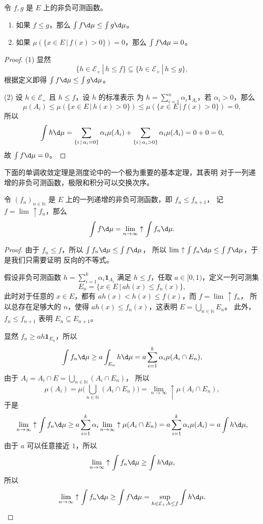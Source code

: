 \documentclass[fontset=none]{Notes}
\newcommand{\ulim}[1][]{\lim_{#1}\mathrel{\uparrow}}
\begin{document}
\begin{proposition}\label{prop:elementary property of positive measurable function}
  令 $f,g$ 是 $E$ 上的非负可测函数。
  \begin{enumerate}
    \item 如果 $f\leq g$，那么 $\int f\d\mu\leq \int g\d\mu$。
    \item 如果 $\mu(\{x\in E\,|\, f(x)> 0\})=0$，那么 $\int f\d\mu=0$。
  \end{enumerate}
\end{proposition}
\begin{proof}
  (1) 显然
  \[
      \bigl\{h\in \mathcal{E}_+\,|\, h\leq f\bigr\}\subseteq 
      \bigl\{h\in \mathcal{E}_+\,|\, h\leq g\bigr\},
  \]
  根据定义即得 $\int f\d\mu\leq \int g\d\mu$。

  (2) 设 $h\in \mathcal{E}_+$ 且 $h\leq f$，设 $h$ 的标准表示
  为 $h=\sum_{i=1}^n \alpha_i\mathbold 1_{A_i}$，若 $\alpha_i> 0$，那么
  \[
    \mu(A_i)\leq   \mu (\{x\in E\,|\, h(x)> 0\})\leq \mu(\{x\in E\,|\, f(x)> 0\})=0,
  \]
  所以
  \[
    \int h\d\mu=\sum_{\{i\,|\,\alpha_i=0\}}\alpha_i\mu(A_i)+
    \sum_{\{i\,|\,\alpha_i>0\}}\alpha_i\mu(A_i)=0+0=0,
  \]
  故 $\int f\d\mu=0$。
\end{proof}

下面的单调收敛定理是测度论中的一个极为重要的基本定理，其表明
对于一列递增的非负可测函数，极限和积分可以交换次序。

\begin{theorem}[单调收敛定理]\label{thm:monotone convergence thm}
  令 $(f_n)_{n\in \mathbb{N}}$ 是 $E$ 上的一列递增的非负可测函数，即 $f_n\leq f_{n+1}$，
  记 $f=\ulim f_n$，那么
  \[
    \int f\d\mu=\ulim[n\to\infty]\int f_n\d\mu.
  \]
\end{theorem}
\begin{proof}
  由于 $f_n\leq f$，所以 $\int f_n\d\mu\leq\int f\d\mu$，
  所以 $\ulim \int f_n\d\mu\leq\int f\d\mu$，于是我们只需要证明
  反向的不等式。

  假设非负可测函数 $h=\sum_{i=1}^k \alpha_i\mathbold 1_{A_i}$
  满足 $h\leq f$，任取 $a\in[0,1)$，定义一列可测集
  \[
    E_n=\{x\in E\,|\, ah(x)\leq f_n(x)\}  ,
  \]
  此时对于任意的 $x\in E$，都有 $ah(x)<h(x)\leq f(x)$，而 $f=\ulim f_n$，
  所以总存在足够大的 $n$，使得 $ah(x)\leq f_n(x)$，这表明 $E=\bigcup_{n\in \mathbb{N}}E_n$。
  此外，$f_n\leq f_{n+1}$ 表明 $E_n\subseteq E_{n+1}$。

  显然 $f_n\geq ah\mathbold 1_{E_n}$，所以
  \[
    \int f_n\d\mu\geq a\int_{E_n} h\d\mu=
    a\sum_{i=1}^k\alpha_i\mu(A_i\cap E_n),  
  \]
  由于 $A_i=A_i\cap E=\bigcup_{n\in \mathbb{N}}(A_i\cap E_n)$，
  所以
  \[
    \mu(A_i)=\mu\biggl(\bigcup_{n\in \mathbb{N}}(A_i\cap E_n)\biggr)
    =\ulim[n\to\infty]\mu(A_i\cap E_n),
  \]
  于是
  \[
    \ulim[n\to\infty]\int f_n\d\mu\geq a\sum_{i=1}^k
    \alpha_i\ulim[n\to\infty]\mu(A_i\cap E_n)
    =  a\sum_{i=1}^k\alpha_i\mu(A_i)
    =a\int h\d\mu,
  \]
  由于 $a$ 可以任意接近 $1$，所以
  \[
    \ulim[n\to\infty]\int f_n\d\mu\geq \int h\d\mu,
  \]
  所以
  \[
    \ulim[n\to\infty]\int f_n\d\mu\geq \int f\d\mu=
    \sup_{h\in \mathcal{E}_+,h\leq f}\int h\d\mu.\qedhere
  \]
\end{proof}
\end{document}
